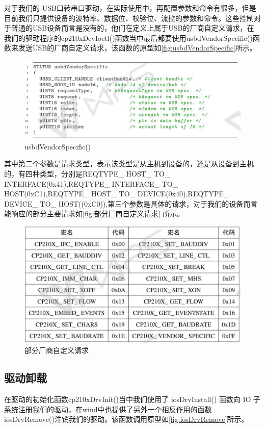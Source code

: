 对于我们的 USB口转串口驱动，在实际使用中，再配置参数和命令有很多，但是目前我们只提供设备的波特率、数据位、校验位、流控的参数和命令。这些控制对于普通的USB设备而言是没有的，他们在定义上属于USB的厂商自定义请求，在我们的驱动程序的cp210xDevIoctl()函数当中最后都要使用usbdVendorSpecific()函数来发送USB的厂商自定义请求，该函数的原型如\autoref{fig:usbdVendorSpecific}所示。


\begin{figure}[!h]
\centering
\includegraphics[width=1.0\textwidth]{./graphics/usbdVendorSpecify.pdf}
\caption{usbdVendorSpecific()}\label{fig:usbdVendorSpecific}
\end{figure}

其中第二个参数是请求类型，表示该类型是从主机到设备的，还是从设备到主机的，有四种类型，分别是REQTYPE\_ HOST\_ TO\_ INTERFACE(0x41),REQTYPE\_ INTERFACE\_ TO\_ HOST(0xC1),REQTYPE\_ HOST\_ TO\_ DEVICE(0x40),REQTYPE\_ DEVICE\_ TO\_ HOST((0xC0)),第三个参数是具体的请求，对于我们的设备而言能响应的部分主要请求如\autoref{fig:部分厂商自定义请求} 所示。

\begin{figure}[!h]
\centering
\includegraphics[width=1.0\textwidth]{./graphics/vendorSpecify.pdf}
\caption{部分厂商自定义请求}\label{fig:部分厂商自定义请求}
\end{figure}


\subsection{驱动卸载}
	在驱动的初始化函数cp210xDrvInit()当中我们使用了 iosDrvInstall() 函数向 IO 子系统注册我们的驱动，在wind中也提供了另外一个相反作用的函数iosDrvRemove()注销我们的驱动。该函数调用原型如\autoref{fig:iosDrvRemove}所示。
	
